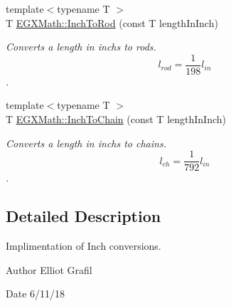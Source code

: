 \begin{DoxyCompactItemize}
{\footnotesize template$<$typename T $>$ }\\T \mbox{\hyperlink{group___e_g_x_math-_conversions-_length_conversions-_imperial-_inch-_surveyors_gaa045e03f8adf2c109c70a2446ac391ef}{E\+G\+X\+Math\+::\+Inch\+To\+Rod}} (const T length\+In\+Inch)
\begin{DoxyCompactList}\small\item\em Converts a length in inchs to rods. \[ l_{rod}= \frac{1}{198} l_{in} \]. \end{DoxyCompactList}\item 
{\footnotesize template$<$typename T $>$ }\\T \mbox{\hyperlink{group___e_g_x_math-_conversions-_length_conversions-_imperial-_inch-_surveyors_ga9345ec4d847b89c4e61531f8044d10d8}{E\+G\+X\+Math\+::\+Inch\+To\+Chain}} (const T length\+In\+Inch)
\begin{DoxyCompactList}\small\item\em Converts a length in inchs to chains. \[ l_{ch}= \frac{1}{792} l_{in} \]. \end{DoxyCompactList}\end{DoxyCompactItemize}


\subsection{Detailed Description}
Implimentation of Inch conversions. 

\begin{DoxyAuthor}{Author}
Elliot Grafil 
\end{DoxyAuthor}
\begin{DoxyDate}{Date}
6/11/18 
\end{DoxyDate}
